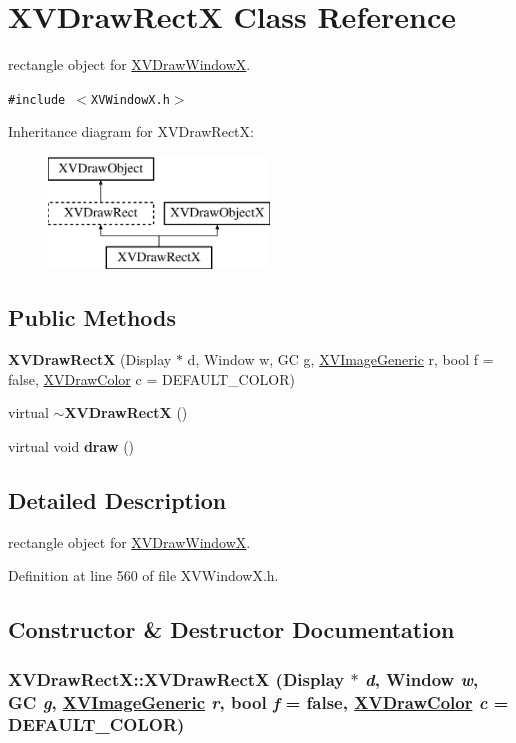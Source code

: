 \hypertarget{class_XVDrawRectX}{
\section{XVDraw\-Rect\-X  Class Reference}
\label{XVDrawRectX}
}
rectangle object for \hyperlink{class_XVDrawWindowX}{XVDraw\-Window\-X}. 


{\tt \#include $<$XVWindow\-X.h$>$}

Inheritance diagram for XVDraw\-Rect\-X:\begin{figure}[H]
\begin{center}
\leavevmode
\includegraphics[height=3cm]{class_XVDrawRectX}
\end{center}
\end{figure}
\subsection*{Public Methods}
\begin{CompactItemize}
\item 
{\bf XVDraw\-Rect\-X} (Display $\ast$ d, Window w, GC g, \hyperlink{class_XVImageGeneric}{XVImage\-Generic} r, bool f = false, \hyperlink{class_XVDrawColor}{XVDraw\-Color} c = DEFAULT\_\-COLOR)
\item 
virtual {\bf $\sim$XVDraw\-Rect\-X} ()
\item 
virtual void {\bf draw} ()
\end{CompactItemize}


\subsection{Detailed Description}
rectangle object for \hyperlink{class_XVDrawWindowX}{XVDraw\-Window\-X}.





Definition at line 560 of file XVWindow\-X.h.

\subsection{Constructor \& Destructor Documentation}
\label{XVDrawRectX_a0}
\hypertarget{class_XVDrawRectX_a0}{
\subsubsection[XVDrawRectX]{\setlength{\rightskip}{0pt plus 5cm}XVDraw\-Rect\-X::XVDraw\-Rect\-X (Display $\ast$ {\em d}, Window {\em w}, GC {\em g}, \hyperlink{class_XVImageGeneric}{XVImage\-Generic} {\em r}, bool {\em f} = false, \hyperlink{class_XVDrawColor}{XVDraw\-Color} {\em c} = DEFAULT\_\-COLOR)}}




